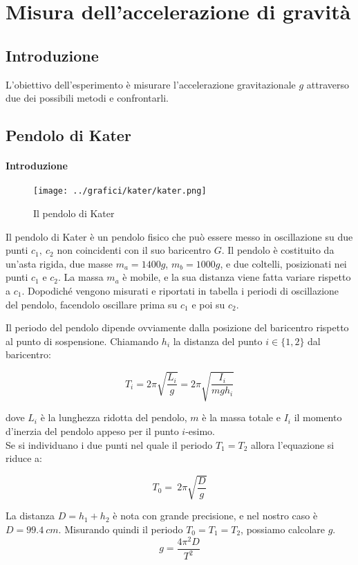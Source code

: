 \chapter{Misura dell'accelerazione di gravità}
\section{Introduzione}
L'obiettivo dell'esperimento è misurare l'accelerazione gravitazionale $g$ attraverso due dei possibili metodi e confrontarli. 

\section{Pendolo di Kater}
\subsubsection{Introduzione}
\begin{wrapfigure}{R}{0.28\textwidth}
  \begin{center}
\texttt{[image: ../grafici/kater/kater.png]}
  \end{center}
  \caption*{Il pendolo di Kater}
\end{wrapfigure}

Il pendolo di Kater è un pendolo fisico che può essere messo in oscillazione su due punti $c_1,\ c_2$ non coincidenti con il suo baricentro $G$. Il pendolo è costituito da un'asta rigida, due masse $m_a = 1400g$, $m_b=1000g$, e due coltelli, posizionati nei punti $c_1$ e $c_2$. La massa $m_a$ è mobile, e la sua distanza viene fatta variare rispetto a $c_1$. Dopodiché vengono misurati e riportati in tabella i periodi di oscillazione del pendolo, facendolo oscillare prima su $c_1$ e poi su $c_2$.

Il periodo del pendolo dipende ovviamente dalla posizione del baricentro rispetto al punto di sospensione. Chiamando $h_i$ la distanza del punto $i\in\{1,2\}$ dal baricentro:

$$ T_i = 2 \pi \sqrt{\frac{L_i}{g}} = 2 \pi \sqrt{\frac{I_i}{m gh_i}}$$

dove $L_i$ è la lunghezza ridotta del pendolo, $m$ è la massa totale e $I_i$ il momento d'inerzia del pendolo appeso per il punto $i$-esimo.
\\
Se si individuano i due punti nel quale il periodo $T_1 = T_2$ allora l'equazione si riduce a:

$$ T_0 = \ 2 \pi \sqrt{\frac{D}{g}}$$

La distanza $D= h_1 + h_2 $  è nota con grande precisione, e nel nostro caso è $D=99.4\ cm$. Misurando quindi il periodo $T_0=T_1=T_2$, possiamo calcolare $g$.
$$ g = \frac{4\pi^2D}{T^2}$$
